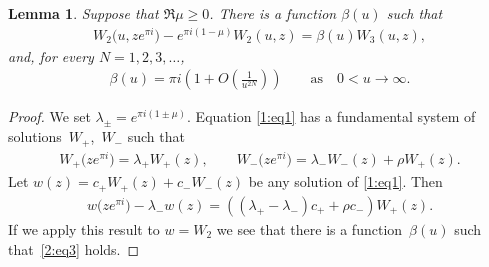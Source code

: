 \documentclass[11pt]{article}
\numberwithin{equation}{section}
\newtheorem{Lemma}[Theorem]{Lemma}
{ \theoremstyle{definition}
\newtheorem{Remarks}[Theorem]{Remarks} }
\begin{document}
\begin{Lemma}\label{2:l2}
Suppose that $\Re\mu\ge 0$. There is a function $\beta(u)$ such that
\begin{gather}\label{2:eq3}
 W_2\big(u,ze^{\pi i}\big)-e^{\pi i(1-\mu)}W_2(u,z)= \beta(u) W_3(u,z) ,
\end{gather}
and, for every $N=1,2,3,\dots$,
\begin{gather}\label{2:beta}
 \beta(u)=\pi i\left(1+O\left(\frac{1}{u^{2N}}\right)\right)\qquad\text{as}\quad 0<u\to\infty.
 \end{gather}
\end{Lemma}
\begin{proof}
We set $\lambda_\pm=e^{\pi i(1\pm\mu)}$. Equation \eqref{1:eq1} has a fundamental system of solutions~$W_+$,~$W_-$ such that
\begin{gather*}
W_+\big(ze^{\pi i}\big)=\lambda_+ W_+(z),\qquad
W_-\big(ze^{\pi i}\big)=\lambda_- W_-(z)+\rho W_+(z) .
\end{gather*}
Let $w(z)=c_+W_+(z)+c_-W_-(z)$ be any solution of \eqref{1:eq1}.
Then
\begin{gather*}
w\big(ze^{\pi i}\big)-\lambda_- w(z)=((\lambda_+-\lambda_-)c_++\rho c_-) W_+(z).
\end{gather*}
If we apply this result to $w=W_2$ we see that there is a function~$\beta(u)$ such that~\eqref{2:eq3} holds.


\end{proof}
\end{document}
